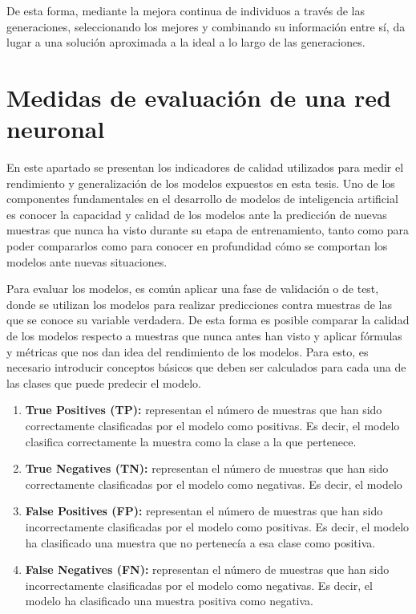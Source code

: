 De esta forma, mediante la mejora continua de individuos a través de las generaciones, seleccionando los mejores y combinando su información entre sí, da lugar a una solución aproximada a la ideal a lo largo de las generaciones.

\section{Medidas de evaluación de una red neuronal}

En este apartado se presentan los indicadores de calidad utilizados para medir el rendimiento y generalización de los modelos expuestos en esta tesis. Uno de los componentes fundamentales en el desarrollo de modelos de inteligencia artificial es conocer la capacidad y calidad de los modelos ante la predicción de nuevas muestras que nunca ha visto durante su etapa de entrenamiento, tanto como para poder compararlos como para conocer en profundidad cómo se comportan los modelos ante nuevas situaciones.

Para evaluar los modelos, es común aplicar una fase de validación o de test, donde se utilizan los modelos para realizar predicciones contra muestras de las que se conoce su variable verdadera. De esta forma es posible comparar la calidad de los modelos respecto a muestras que nunca antes han visto y aplicar fórmulas y métricas que nos dan idea del rendimiento de los modelos. Para esto, es necesario introducir conceptos básicos que deben ser calculados para cada una de las clases que puede predecir el modelo.

\begin{enumerate}
	\item \textbf{True Positives (TP):} representan el número de muestras que han sido correctamente clasificadas por el modelo como positivas. Es decir, el modelo clasifica correctamente la muestra como la clase a la que pertenece.
	\item \textbf{True Negatives (TN):} representan el número de muestras que han sido correctamente clasificadas por el modelo como negativas. Es decir, el modelo
	\item \textbf{False Positives (FP):} representan el número de muestras que han sido incorrectamente clasificadas por el modelo como positivas. Es decir, el modelo ha clasificado una muestra que no pertenecía a esa clase como positiva.
	\item \textbf{False Negatives (FN):} representan el número de muestras que han sido incorrectamente clasificadas por el modelo como negativas. Es decir, el modelo ha clasificado una muestra positiva como negativa.
\end{enumerate}

